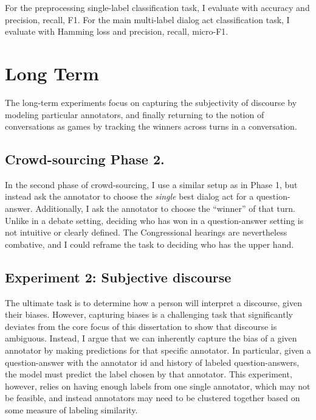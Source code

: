 For the preprocessing single-label classification task, I evaluate with accuracy and precision, recall, F1. For the main multi-label dialog act classification task, I evaluate with Hamming loss and precision, recall, micro-F1. 


\section{Long Term} 
The long-term experiments focus on capturing the subjectivity of discourse by modeling particular annotators, and finally returning to the notion of conversations as games by tracking the winners across turns in a conversation.

\subsection{Crowd-sourcing Phase 2.}
\label{subsec:phase2}
In the second phase of crowd-sourcing, I use a similar setup as in Phase 1, but instead ask the annotator to choose the \emph{single} best dialog act for a question-answer. Additionally, I ask the annotator to choose the ``winner'' of that turn. Unlike in a debate setting, deciding who has won in a question-answer setting is not intuitive or clearly defined. The Congressional hearings are nevertheless combative, and I could reframe the task to deciding who has the upper hand. 

\subsection{Experiment 2: Subjective discourse} The ultimate task is to determine how a person will interpret a discourse, given their biases. However, capturing biases is a  challenging task that significantly deviates from the core focus of this dissertation to show that discourse is ambiguous. Instead, I argue that we can inherently capture the bias of a given annotator by making predictions for that specific annotator. In particular, given a question-answer with the annotator id and history of labeled question-answers, the model must predict the label chosen by that annotator. This experiment, however, relies on having enough labels from one single annotator, which may not be feasible, and instead annotators may need to be clustered together based on some measure of labeling similarity.

